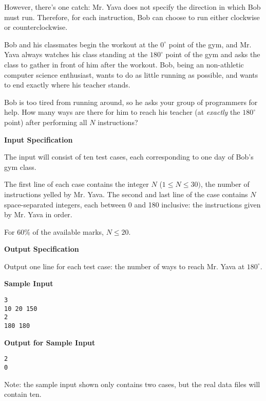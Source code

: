 \documentclass[11pt]{article}
\newcommand{\heading}[1]{\vspace{0.6em} \textbf{#1}}
\begin{document}
However, there's one catch: Mr. Yava does not specify the direction in which Bob must run. Therefore, for each instruction, Bob can choose to run either clockwise or counterclockwise.

Bob and his classmates begin the workout at the $0^{\circ}$ point of the gym, and Mr. Yava always watches his class standing at the $180^{\circ}$ point of the gym and asks the class to gather in front of him after the workout. Bob, being an non-athletic computer science enthusiast, wants to do as little running as possible, and wants to end exactly where his teacher stands.

Bob is too tired from running around, so he asks your group of programmers for help. How many ways are there for him to reach his teacher (at \textit{exactly} the $180^{\circ}$ point) after performing all $N$ instructions?


\heading{Input Specification}

The input will consist of ten test cases, each corresponding to one day of Bob's gym class.

The first line of each case contains the integer $N$ ($1 \le N \le 30)$, the number of instructions yelled by Mr. Yava. The second and last line of the case contains $N$ space-separated integers, each between 0 and 180 inclusive: the instructions given by Mr. Yava in order.

For 60\% of the available marks, $N \le 20$.


\heading{Output Specification}

Output one line for each test case: the number of ways to reach Mr. Yava at $180^{\circ}$.


\heading{Sample Input}
\vspace{-\topsep}
\begin{verbatim}
3
10 20 150
2
180 180
\end{verbatim}

\vspace{-\topsep}
\heading{Output for Sample Input}
\vspace{-\topsep}
\begin{verbatim}
2
0
\end{verbatim}

Note: the sample input shown only contains two cases, but the real data files will contain ten.

\end{document}
